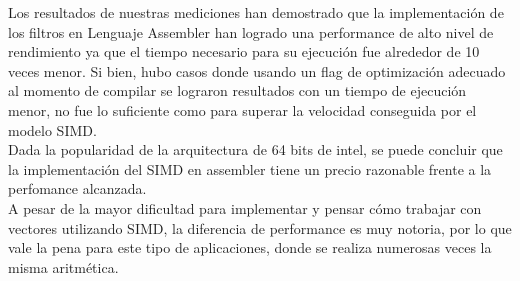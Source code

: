 \documentclass[10pt,a4paper,spanish]{article}
\begin{document}
Los resultados de nuestras mediciones han demostrado que la implementación de los filtros en Lenguaje Assembler han logrado una performance de alto nivel de rendimiento ya que el tiempo necesario para su ejecución fue alrededor de 10 veces menor. Si bien, hubo casos donde usando un flag de optimización adecuado al momento de compilar se lograron resultados con un tiempo de ejecución menor, no fue lo suficiente como para superar la velocidad conseguida por el modelo SIMD. \\

Dada la popularidad de la arquitectura de 64 bits de intel, se puede concluir que la implementación del SIMD en assembler tiene un precio razonable frente a la perfomance alcanzada.\\

A pesar de la mayor dificultad para implementar y pensar cómo trabajar con vectores utilizando SIMD, la diferencia de performance es muy notoria, por lo que vale la pena para este tipo de aplicaciones, donde se realiza numerosas veces la misma aritmética.





\end{document}
